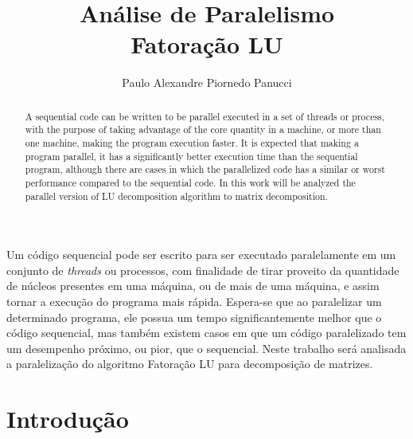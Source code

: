 \documentclass[12pt]{article}
\title{Análise de Paralelismo\\ Fatoração LU}
\author{Paulo Alexandre Piornedo Panucci\inst{1}}
\begin{document}
 

\maketitle

\begin{abstract}
A sequential code can be written to be parallel executed in a set of threads or process, with the purpose of taking advantage of the core quantity in a machine, or more than one machine, making the program execution faster. It is expected that making a program parallel, it has a significantly better execution time than the sequential program, although there are cases in which the parallelized code has a similar or worst performance compared to the sequential code. In this work will be analyzed the parallel version of LU decomposition algorithm to matrix decomposition. 
\end{abstract}
     
\begin{resumo}
Um código sequencial pode ser escrito para ser executado paralelamente em um conjunto de \textit{threads} ou processos, com finalidade de tirar proveito da quantidade de núcleos presentes em uma máquina, ou de mais de uma máquina, e assim tornar a execução do programa mais rápida. Espera-se que ao paralelizar um determinado programa, ele possua um tempo significantemente melhor que o código sequencial, mas também existem casos em que um código paralelizado tem um desempenho próximo, ou pior, que o sequencial. Neste trabalho será analisada a paralelização do algoritmo Fatoração LU para decomposição de matrizes.  
\end{resumo}


\section{Introdução}\label{sec:intro}
\end{document}
